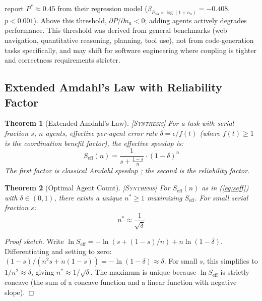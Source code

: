 \documentclass[11pt, a4paper, copyright]{googledeepmind}
\newtheorem{theorem}{Theorem}[section]
\newcommand{\synthesis}{\textsc{[Synthesis]}}
\begin{document}
\citet{Kim2025} report $P^* \approx 0.45$ from their regression model ($\beta_{P_{\mathrm{SA}} \times \log(1+n_a)} = -0.408$, $p < 0.001$).
Above this threshold, $\partial P / \partial n_a < 0$; adding agents actively degrades performance.
This threshold was derived from general benchmarks (web navigation, quantitative reasoning, planning, tool use), not from code-generation tasks specifically, and may shift for software engineering where coupling is tighter and correctness requirements stricter.

\subsection{Extended Amdahl's Law with Reliability Factor}

\begin{theorem}[Extended Amdahl's Law] \synthesis{}
\label{thm:amdahl}
For a task with serial fraction $s$, $n$ agents, effective per-agent error rate $\delta = \epsilon / f(t)$ (where $f(t) \geq 1$ is the coordination benefit factor), the effective speedup is:
\begin{equation}
\label{eq:seff}
  S_{\mathrm{eff}}(n) = \frac{1}{s + \frac{1-s}{n}} \cdot (1 - \delta)^n
\end{equation}
The first factor is classical Amdahl speedup \citep{Amdahl1967}; the second is the reliability factor.
\end{theorem}

\begin{theorem}[Optimal Agent Count] \synthesis{}
\label{thm:nstar}
For $S_{\mathrm{eff}}(n)$ as in (\ref{eq:seff}) with $\delta \in (0,1)$, there exists a unique $n^* \geq 1$ maximizing $S_{\mathrm{eff}}$.
For small serial fraction $s$:
\begin{equation}
\label{eq:nstar}
  n^* \approx \frac{1}{\sqrt{\delta}}
\end{equation}
\end{theorem}

\begin{proof}[Proof sketch]
Write $\ln S_{\mathrm{eff}} = -\ln(s + (1-s)/n) + n \ln(1-\delta)$.
Differentiating and setting to zero: $(1-s)/(n^2 s + n(1-s)) = -\ln(1-\delta) \approx \delta$.
For small $s$, this simplifies to $1/n^2 \approx \delta$, giving $n^* \approx 1/\sqrt{\delta}$.
The maximum is unique because $\ln S_{\mathrm{eff}}$ is strictly concave (the sum of a concave function and a linear function with negative slope).
\end{proof}
\end{document}
